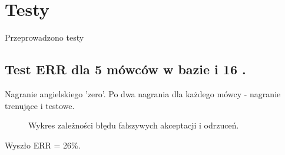 \chapter{Testy}

Przeprowadzono testy 

\section{Test ERR dla 5 mówców w bazie i 16 .}

Nagranie angielskiego 'zero'. Po dwa nagrania dla każdego mówcy - nagranie trenujące i testowe.


\begin{figure}[ht!]
  \centering
    
    \caption{\label{fig:err} Wykres zależności błędu fałszywych akceptacji i odrzuceń.}
\end{figure}
Wyszło ERR = 26\%. 
